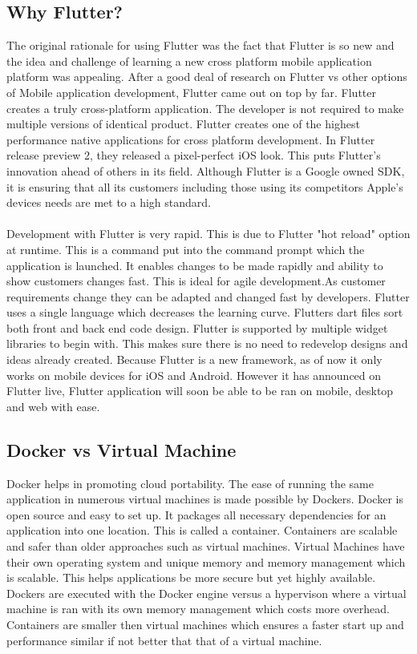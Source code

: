 \subsection{Why Flutter?}
The original rationale for using Flutter was the fact that Flutter is so new and the idea and challenge of learning a new cross platform mobile application platform was appealing. After a good deal of research on Flutter vs other options of Mobile application development, Flutter came out on top by far. Flutter creates a truly cross-platform application. The developer is not required to make multiple versions of identical product. Flutter creates one of the highest performance native applications for cross platform development. In Flutter release preview 2, they released a pixel-perfect iOS look. This puts Flutter's innovation ahead of others in its field. Although Flutter is a Google owned SDK, it is ensuring that all its customers including those using its competitors Apple's devices needs are met to a high standard.
\paragraph{}Development with Flutter is very rapid. This is due to Flutter "hot reload" option at runtime. This is a command put into the command prompt which the application is launched. It enables changes to be made rapidly and ability to show customers changes fast. This is ideal for agile development.As customer requirements change they can be adapted and changed fast by developers. Flutter uses a single language which decreases the learning curve. Flutters dart files sort both front and back end code design. Flutter is supported by multiple widget libraries to begin with. This makes sure there is no need to redevelop designs and ideas already created. Because Flutter is a new framework, as of now it only works on mobile devices for iOS and Android. However it has announced on Flutter live, Flutter application will soon be able to be ran on mobile, desktop and web with ease.

\subsection{Docker vs Virtual Machine}
Docker helps in promoting cloud portability. The ease of running the same application in numerous virtual machines is made possible by Dockers. Docker is open source and easy to set up. It packages all necessary dependencies for an application into one location. This is called a container. Containers are scalable and safer than older approaches such as virtual machines. Virtual Machines have their own operating system and unique memory and memory management which is scalable.\cite{seshachala_2019} This helps applications be more secure but yet highly available. Dockers are executed with the Docker engine versus a hypervison where a virtual machine is ran with its own memory management which costs more overhead. Containers are smaller then virtual machines which ensures a faster start up and performance similar if not better that that of a virtual machine.\cite{bauer_bauer_2019}

